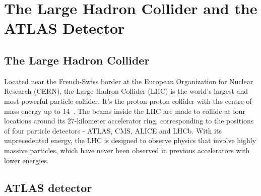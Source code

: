 \chapter{The Large Hadron Collider and the ATLAS Detector}

\section{The Large Hadron Collider}
Located near the French-Swiss border at the European Organization for Nuclear Research (CERN),
the Large Hadron Collider (LHC) is the world's largest and most powerful particle collider.
It's the proton-proton collider with the centre-of-mass energy up to 14~\tev.
The beams inside the LHC are made to collide at four locations around its 27-kilometer accelerator ring, 
corresponding to the positions of four particle detectors - ATLAS, CMS, ALICE and LHCb.
With its unprecedented energy, the LHC is designed to observe physics that involve highly massive particles,
which have never been observed in previous accelerators with lower energies.




\section{ATLAS detector}



